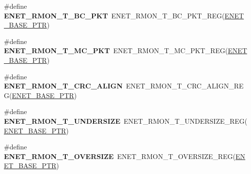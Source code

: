 \begin{DoxyCompactItemize}
\item 
\hypertarget{group___e_n_e_t___register___accessor___macros_gadc3115bf35fbd9a601fb7fec5e8518e1}{}\#define {\bfseries E\+N\+E\+T\+\_\+\+R\+M\+O\+N\+\_\+\+T\+\_\+\+B\+C\+\_\+\+P\+K\+T}~E\+N\+E\+T\+\_\+\+R\+M\+O\+N\+\_\+\+T\+\_\+\+B\+C\+\_\+\+P\+K\+T\+\_\+\+R\+E\+G(\hyperlink{group___e_n_e_t___peripheral_gab64a2d991cc2bd76dd55ee25a52dcb5c}{E\+N\+E\+T\+\_\+\+B\+A\+S\+E\+\_\+\+P\+T\+R})\label{group___e_n_e_t___register___accessor___macros_gadc3115bf35fbd9a601fb7fec5e8518e1}

\item 
\hypertarget{group___e_n_e_t___register___accessor___macros_gab5d1774f09344c97cb14cb81205e0cff}{}\#define {\bfseries E\+N\+E\+T\+\_\+\+R\+M\+O\+N\+\_\+\+T\+\_\+\+M\+C\+\_\+\+P\+K\+T}~E\+N\+E\+T\+\_\+\+R\+M\+O\+N\+\_\+\+T\+\_\+\+M\+C\+\_\+\+P\+K\+T\+\_\+\+R\+E\+G(\hyperlink{group___e_n_e_t___peripheral_gab64a2d991cc2bd76dd55ee25a52dcb5c}{E\+N\+E\+T\+\_\+\+B\+A\+S\+E\+\_\+\+P\+T\+R})\label{group___e_n_e_t___register___accessor___macros_gab5d1774f09344c97cb14cb81205e0cff}

\item 
\hypertarget{group___e_n_e_t___register___accessor___macros_ga69f8c3aea1ac5b0694446dce0cc4ff6b}{}\#define {\bfseries E\+N\+E\+T\+\_\+\+R\+M\+O\+N\+\_\+\+T\+\_\+\+C\+R\+C\+\_\+\+A\+L\+I\+G\+N}~E\+N\+E\+T\+\_\+\+R\+M\+O\+N\+\_\+\+T\+\_\+\+C\+R\+C\+\_\+\+A\+L\+I\+G\+N\+\_\+\+R\+E\+G(\hyperlink{group___e_n_e_t___peripheral_gab64a2d991cc2bd76dd55ee25a52dcb5c}{E\+N\+E\+T\+\_\+\+B\+A\+S\+E\+\_\+\+P\+T\+R})\label{group___e_n_e_t___register___accessor___macros_ga69f8c3aea1ac5b0694446dce0cc4ff6b}

\item 
\hypertarget{group___e_n_e_t___register___accessor___macros_gac7beffe56548ecad6d37ce6dd73958ff}{}\#define {\bfseries E\+N\+E\+T\+\_\+\+R\+M\+O\+N\+\_\+\+T\+\_\+\+U\+N\+D\+E\+R\+S\+I\+Z\+E}~E\+N\+E\+T\+\_\+\+R\+M\+O\+N\+\_\+\+T\+\_\+\+U\+N\+D\+E\+R\+S\+I\+Z\+E\+\_\+\+R\+E\+G(\hyperlink{group___e_n_e_t___peripheral_gab64a2d991cc2bd76dd55ee25a52dcb5c}{E\+N\+E\+T\+\_\+\+B\+A\+S\+E\+\_\+\+P\+T\+R})\label{group___e_n_e_t___register___accessor___macros_gac7beffe56548ecad6d37ce6dd73958ff}

\item 
\hypertarget{group___e_n_e_t___register___accessor___macros_ga70b790437654820ef8d2fb4ccd56bac6}{}\#define {\bfseries E\+N\+E\+T\+\_\+\+R\+M\+O\+N\+\_\+\+T\+\_\+\+O\+V\+E\+R\+S\+I\+Z\+E}~E\+N\+E\+T\+\_\+\+R\+M\+O\+N\+\_\+\+T\+\_\+\+O\+V\+E\+R\+S\+I\+Z\+E\+\_\+\+R\+E\+G(\hyperlink{group___e_n_e_t___peripheral_gab64a2d991cc2bd76dd55ee25a52dcb5c}{E\+N\+E\+T\+\_\+\+B\+A\+S\+E\+\_\+\+P\+T\+R})\label{group___e_n_e_t___register___accessor___macros_ga70b790437654820ef8d2fb4ccd56bac6}


\end{DoxyCompactItemize}
